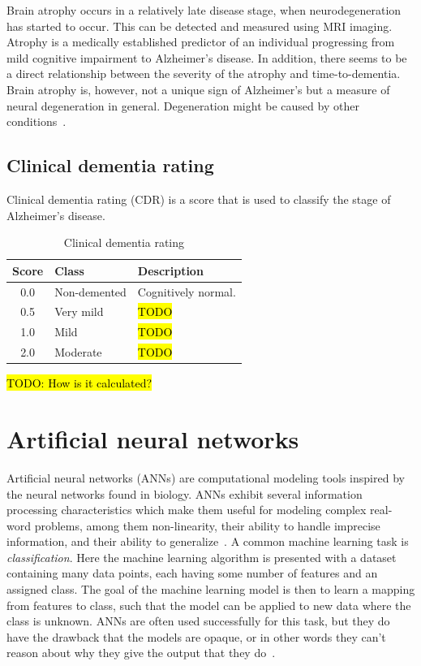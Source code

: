 \documentclass{kththesis}
\renewcommand{\arraystretch}{1.2}
\begin{document}
Brain atrophy occurs in a relatively late disease stage, when neurodegeneration has started to occur. This can be detected and measured using MRI imaging. Atrophy is a medically established predictor of an individual progressing from mild cognitive impairment to Alzheimer's disease. In addition, there seems to be a direct relationship between the severity of the atrophy and time-to-dementia. Brain atrophy is, however, not a unique sign of Alzheimer's but a measure of neural degeneration in general. Degeneration might be caused by other conditions~\cite{jack2010brain}.

\subsection{Clinical dementia rating}
Clinical dementia rating (CDR) is a score that is used to classify the stage of Alzheimer’s disease.
\begin{table}[h]
  \renewcommand{\arraystretch}{1.2}
  \begin{center}
    \caption{Clinical dementia rating}
    \label{tab:cdr_definition}
    \begin{tabular}{c|ll}
      \textbf{Score} & \textbf{Class} & \textbf{Description} \\
      \toprule
      0.0 & Non-demented & Cognitively normal. \\
      0.5 & Very mild & \hl{TODO} \\
      1.0 & Mild & \hl{TODO} \\
      2.0 & Moderate & \hl{TODO} \\
    \end{tabular}
  \end{center}
\end{table}

\hl{TODO: How is it calculated?}

\section{Artificial neural networks}
Artificial neural networks (ANNs) are computational modeling tools inspired by the neural networks found in biology. ANNs exhibit several information processing characteristics which make them useful for modeling complex real-word problems, among them non-linearity, their ability to handle imprecise information, and their ability to generalize~\cite{ANNFundamentals}. A common machine learning task is \textit{classification}. Here the machine learning algorithm is presented with a dataset containing many data points, each having some number of features and an assigned class. The goal of the machine learning model is then to learn a mapping from features to class, such that the model can be applied to new data where the class is unknown. ANNs are often used successfully for this task, but they do have the drawback that the models are opaque, or in other words they can't reason about why they give the output that they do~\cite[p. 3, 8--9]{weiss1990empirical}.
\end{document}
